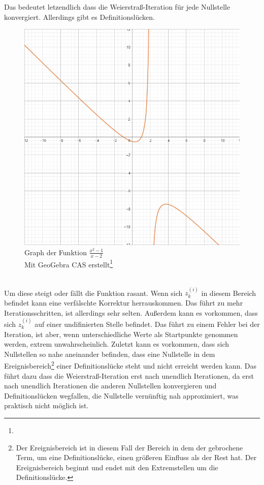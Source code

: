 \documentclass{article}
\begin{document}
Das bedeutet letzendlich dass die Weierstraß-Iteration für jede Nullstelle konvergiert. Allerdings gibt es Definitionslücken. \\
\begin{figure}[h]
    \centering
    \includegraphics[scale=.4]{(x^2-1)geteilt(x-2).png} \\
    \vspace*{0.3cm}
    Graph der Funktion $\frac{x^2-1}{x-2}$\\
    Mit GeoGebra CAS erstellt\footnote{}
\end{figure} \\
Um diese steigt oder fällt die Funktion rasant. Wenn sich $z_k^{(i)}$ in diesem Bereich befindet kann eine verfälschte Korrektur herrauskommen. Das führt zu mehr Iterationsschritten, ist allerdings sehr selten. Außerdem kann es vorkommen, dass sich $z_k^{(i)}$ auf einer undifinierten Stelle befindet. Das führt zu einem Fehler bei der Iteration, ist aber, wenn unterschiedliche Werte als Startpunkte genommen werden, extrem unwahrscheinlich. Zuletzt kann es vorkommen, dass sich Nullstellen so nahe aneinander befinden, dass eine Nullstelle in dem Ereignisbereich\footnote{Der Ereignisbereich ist in diesem Fall der Bereich in dem der gebrochene Term, um eine Definitionslücke, einen größeren Einfluss als der Rest hat. Der Ereignisbereich beginnt und endet mit den Extremstellen um die Definitionslücke.} einer Definitionslücke steht und nicht erreicht werden kann. Das führt dazu dass die Weierstraß-Iteration erst nach unendlich Iterationen, da erst nach unendlich Iterationen die anderen Nullstellen konvergieren und Definitionslücken wegfallen, die Nullstelle vernünftig nah approximiert, was praktisch nicht möglich ist.
\end{document}
